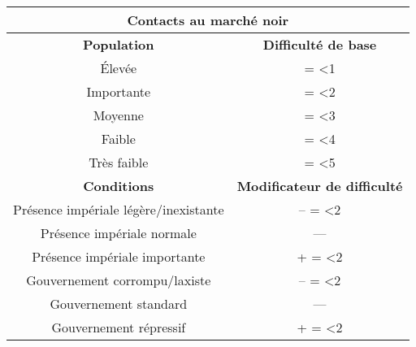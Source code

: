 \documentclass{article}
\makeatletter
\newcommand{\dicepurple}{\hspace{0.1cm}{\Large \texttt{[image: ../img/dice\_purple]}}\hspace{0.1cm}}
\newcommand{\myrepeat}[2]{%
  \begingroup
  \my@repeat@count=\z@
  \@whilenum\my@repeat@count<#1\do{#2\advance\my@repeat@count\@ne}%
  \endgroup
}
\makeatother
\begin{document}
\begin{tabular}{|c|c|}
	\hline 
	\multicolumn{2}{|c|}{\cellcolor{DarkRed} \textbf{{\large \textcolor{PureWhite}{Contacts au marché noir}}}} \\ 
	\hline 
	\cellcolor{DarkGold}\textbf{Population} & \cellcolor{DarkGold}\textbf{Difficulté de base} \\ 
	\hline 
	Élevée & \myrepeat{1}{\dicepurple} \\ 
	\hline 
	Importante & \myrepeat{2}{\dicepurple} \\ 
	\hline 
	Moyenne & \myrepeat{3}{\dicepurple} \\ 
	\hline 
	Faible & \myrepeat{4}{\dicepurple} \\ 
	\hline 
	Très faible & \myrepeat{5}{\dicepurple} \\ 
	\hline 
	\cellcolor{DarkGold}\textbf{Conditions} & \cellcolor{DarkGold}\textbf{Modificateur de difficulté} \\ 
	\hline 
	Présence impériale légère/inexistante & -- \myrepeat{2}{\dicepurple} \\ 
	\hline 
	Présence impériale normale & --- \\ 
	\hline 
	Présence impériale importante &  + \myrepeat{2}{\dicepurple} \\ 
	\hline 
	Gouvernement corrompu/laxiste & -- \myrepeat{2}{\dicepurple} \\ 
	\hline 
	Gouvernement standard & --- \\ 
	\hline 
	Gouvernement répressif & + \myrepeat{2}{\dicepurple} \\ 
	\hline 
\end{tabular}
\end{document}
